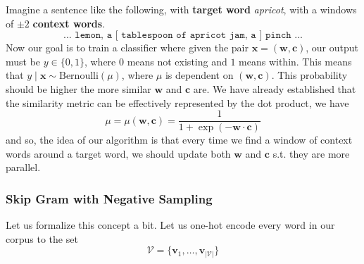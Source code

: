 \documentclass{article}
\begin{document}
      Imagine a sentence like the following, with \textbf{target word} \textit{apricot}, with a windows of $\pm2$ \textbf{context words}. 
      \begin{equation}
        \texttt{... lemon, a [ tablespoon of apricot jam, a ] pinch ...}
      \end{equation}
      Now our goal is to train a classifier where given the pair $\mathbf{x} = (\mathbf{w}, \mathbf{c})$, our output must be $y \in \{0, 1\}$, where $0$ means not existing and $1$ means within. This means that $y \mid \mathbf{x} \sim \mathrm{Bernoulli}(\mu)$, where $\mu$ is dependent on $(\mathbf{w}, \mathbf{c})$. This probability should be higher the more similar $\mathbf{w}$ and $\mathbf{c}$ are. We have already established that the similarity metric can be effectively represented by the dot product, we have 
      \begin{equation}
        \mu = \mu(\mathbf{w}, \mathbf{c}) = \frac{1}{1 + \exp(- \mathbf{w} \cdot \mathbf{c})}
      \end{equation}
      and so, the idea of our algorithm is that every time we find a window of context words around a target word, we should update both $\mathbf{w}$ and $\mathbf{c}$ s.t. they are more parallel. 

    \subsubsection{Skip Gram with Negative Sampling}

      Let us formalize this concept a bit. Let us one-hot encode every word in our corpus to the set 
      \begin{equation}
        \mathcal{V} = \{\mathbf{v}_1, \ldots, \mathbf{v}_{|\mathcal{V}|}\}
      \end{equation}
       
\end{document}
